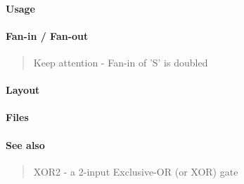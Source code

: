 \paragraph{Usage}

\paragraph{Fan-in / Fan-out}
\begin{quote}
    Keep attention - Fan-in of 'S' is doubled
\end{quote}

\paragraph{Layout}

\paragraph{Files}


\paragraph{See also}
\begin{quote}
    XOR2 - a 2-input Exclusive-OR (or XOR) gate
\end{quote}
